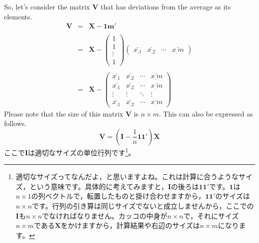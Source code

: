 \documentclass{ltjsbook}
\begin{document}
So, let's consider the matrix $\bm{V}$ that has deviations from the average as its elements.
\[
	\begin{array}{ccl}
		\bm{V} & = & \bm{X} - \bm{1} \bm{m}'                                                                                                                  \\
		       &   &                                                                                                                                          \\
		       & = & \bm{X} - \begin{pmatrix} 1 \\ 1 \\ \vdots \\ 1 \end{pmatrix} \begin{pmatrix} \bar{x_.1} & \bar{x_.2} & \cdots & \bar{x_.m} \end{pmatrix} \\
		       &   &                                                                                                                                          \\
		       & = & \bm{X} - \begin{pmatrix} \bar{x_.1} & \bar{x_.2} & \cdots & \bar{x_.m} \\
                \bar{x_.1} & \bar{x_.2} & \cdots & \bar{x_.m} \\
                \vdots     & \vdots     & \ddots & \vdots     \\
                \bar{x_.1} & \bar{x_.2} & \cdots & \bar{x_.m}\end{pmatrix}
	\end{array}
\]
Please note that the size of this matrix $\bm{V}$ is $n \times m$.
This can also be expressed as follows.
\[ \bm{V} = ( \bm{I} -\frac{1}{n}\bm{1} \bm{1} ')\bm{X} \]
ここで$\bm{I}$は適切なサイズの単位行列です\footnote{適切なサイズってなんだよ，と思いますよね。これは計算に合うようなサイズ，という意味です。具体的に考えてみますと，$\bm{I}$の後ろは$\bm{1}\bm{1}'$です。$\bm{1}$は$n\times 1$の列ベクトルで，転置したものと掛け合わせますから，$\bm{1}\bm{1}'$のサイズは$n \times n$です。行列の引き算は同じサイズでないと成立しませんから，ここでの$\bm{I}$も$n \times n$でなければなりません。カッコの中身が$n \times n$で，それにサイズ$n \times m$である$\bm{X}$をかけますから，計算結果や右辺のサイズは$n \times m$になります。}。
\end{document}
